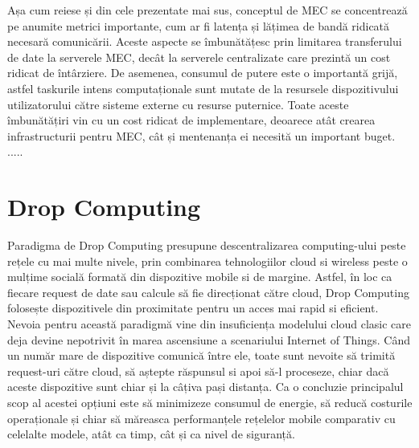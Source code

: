 \documentclass[12pt,a4paper]{report}
\begin{document}
Așa cum reiese și din cele prezentate mai sus, conceptul de MEC se concentrează pe anumite metrici importante, cum ar fi latența și lățimea de bandă ridicată necesară comunicării. Aceste aspecte se îmbunătățesc prin limitarea transferului de date la serverele MEC, decât la serverele centralizate care prezintă un cost ridicat de întârziere. De asemenea, consumul de putere este o importantă grijă, astfel taskurile intens computaționale sunt mutate de la resursele dispozitivului utilizatorului către sisteme externe cu resurse puternice. Toate aceste îmbunătățiri vin cu un cost ridicat de implementare, deoarece atât crearea infrastructurii pentru MEC, cât și mentenanța ei necesită un important buget. 
.....
\section{Drop Computing}
Paradigma de Drop Computing\cite{DC} presupune descentralizarea computing-ului peste rețele cu mai multe nivele, prin combinarea tehnologiilor cloud si wireless peste o mulțime socială formată din dispozitive mobile si de margine. Astfel, în loc ca fiecare request de date sau calcule să fie direcționat către cloud, Drop Computing folosește dispozitivele din proximitate pentru un acces mai rapid si eficient. Nevoia pentru această paradigmă vine din insuficiența modelului cloud clasic care deja devine nepotrivit în marea ascensiune a scenariului Internet of Things. Când un număr mare de dispozitive comunică între ele, toate sunt nevoite să trimită request-uri către cloud, să aștepte răspunsul si apoi să-l proceseze, chiar dacă aceste dispozitive sunt chiar și la câțiva pași distanța.
Ca o concluzie principalul scop al acestei opțiuni este să minimizeze consumul de energie, să reducă costurile operaționale și chiar să măreasca performanțele rețelelor mobile comparativ cu celelalte modele, atât ca timp, cât și ca nivel de siguranță.
	
\end{document}
